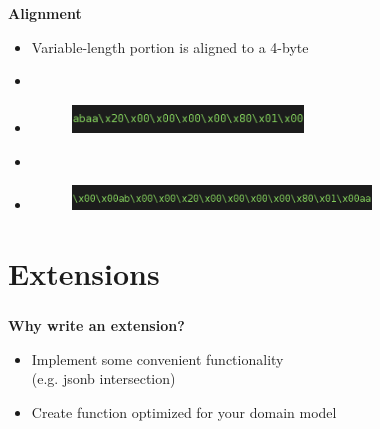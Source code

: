 \documentclass[usenames,dvipsnames, 18pt, compress, aspectratio=169]{beamer}
\begin{document}
\begin{frame}
    \frametitle{}
    \begin{center}
    \textbf{Alignment}

    \begin{itemize}[label={}]
        \item Variable-length portion is aligned to a 4-byte
        \item \inputminted[fontsize=\Large]{sql}{sql/insert_align1.sql}
        \item \begin{figure}
            \includegraphics[width=0.58\textwidth,left]{align_short.png}
        \end{figure}

        \item \inputminted[fontsize=\Large]{sql}{sql/insert_align2.sql}
        \item \begin{figure}
            \includegraphics[width=0.75\textwidth,left]{align_long.png}
        \end{figure}

    \end{itemize}

    \end{center}
\end{frame}

\fontsize{13pt}{14}\selectfont
\section{Extensions}
\fontsize{17pt}{18}\selectfont

\begin{frame}
    \frametitle{}
    \begin{center}
        \textbf{Why write an extension?}

        \vspace{1cm}
        \begin{itemize}[label={\MVRightarrow}]
            \item Implement some convenient functionality\\ (e.g. jsonb intersection)
            \item Create function optimized for your domain model
        \end{itemize}

    \end{center}
\end{frame}
\end{document}
